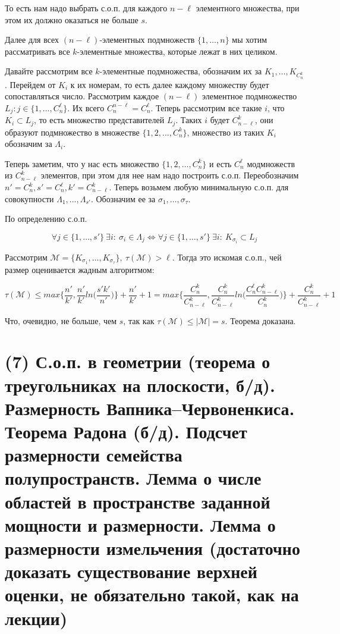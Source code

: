 То есть нам надо выбрать с.о.п. для каждого $n - \ell$ элементного множества, при этом их должно оказаться не больше $s$. 

Далее для всех $(n-\ell)$-элементных подмножеств $\{1, \ldots, n\}$ мы хотим рассматривать все $k$-элементные множества, которые лежат в них целиком.

Давайте рассмотрим все $k$-элементные подмножества, обозначим их за $K_1, \ldots, K_{C_n^k}$. Перейдем от $K_i$ к их номерам, то есть далее каждому множеству будет сопоставляться число. Рассмотрим каждое $(n - \ell)$ элементное подмножество $L_j : j \in \{1, \ldots, C_n^{\ell}\}$. Их всего $C_n^{n - \ell} = C_n^{\ell}$. Теперь рассмотрим все такие $i$, что $K_i \subset L_j$, то есть множество представителей $L_j$. Таких $i$ будет $C_{n-\ell}^k$, они образуют подмножество в множестве $\{1, 2, \ldots, C_n^k\}$, множество из таких $K_i$ обозначим за $\Lambda_i$.

Теперь заметим, что у нас есть множество $\{1, 2, \ldots, C_n^k\}$ и есть $C_n^{\ell}$ модмножеств из $C_{n - \ell}^k$ элементов, при этом для нее нам надо построить с.о.п. Переобозначим $n' = C_n^k, s' = C_n^{\ell}, k' = C_{n - \ell}^k$. Теперь возьмем любую минимальную с.о.п. для совокупности $\Lambda_1, \ldots, \Lambda_{s'}$. Обозначим ее за $\sigma_1, \ldots, \sigma_{\tau}$. 

По определению с.о.п. 

$$\forall j \in \{1, \ldots, s'\} \ \exists i: \ \sigma_i \in \Lambda_j \Longleftrightarrow \forall j \in \{1, \ldots, s'\} \ \exists i: \ K_{\sigma_i} \subset L_j$$

Рассмотрим $\mathcal{M} = \{K_{\sigma_1}, \ldots, K_{\sigma_{\tau}}\}, \ \tau(\mathcal{M}) > \ell$. Тогда это искомая с.о.п., чей размер оценивается жадным алгоритмом:

$$
\tau(\mathcal{M}) \leq max\{ \frac{n'}{k'}, \frac{n'}{k'} ln\bigg(\frac{s'k'}{n'}\bigg)\} + \frac{n'}{k'} + 1 = max\{ \frac{C_n^k}{C_{n - \ell}^k}, \frac{C_n^k}{C_{n - \ell}^k} ln\bigg(\frac{C_n^{\ell} C_{n - \ell}^k}{C_n^k}\bigg)\} + \frac{C_n^k}{C_{n - \ell}^k} + 1
$$

Что, очевидно, не больше, чем $s$, так как $\tau(\mathcal{M}) \leq |\mathcal{M}| = s$. Теорема доказана.

\EndProof
\newpage

\section{(7) С.о.п. в геометрии (теорема о треугольниках на плоскости, б/д). Размерность Вапника–Червоненкиса. Теорема Радона (б/д). Подсчет размерности семейства полупространств. Лемма о числе областей в пространстве заданной мощности и размерности. Лемма о размерности измельчения (достаточно доказать существование верхней оценки, не обязательно такой, как на лекции)}

